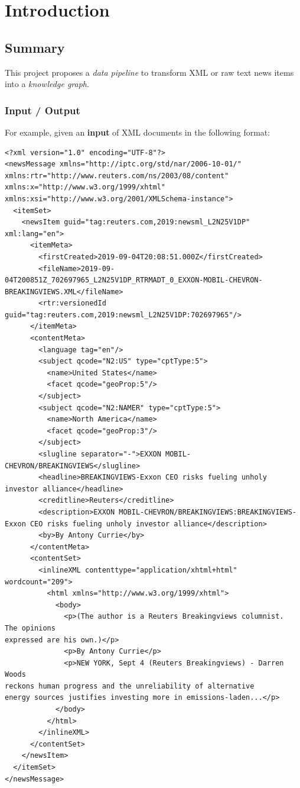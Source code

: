 \documentclass[11pt]{article}
\begin{document}
\newpage
\section{Introduction}
\subsection{Summary}
This project proposes a \textit{data pipeline} to transform XML or raw text news items into a \textit{knowledge graph}.

\subsubsection{Input / Output}
For example, given an \textbf{input} of XML documents in the following format:
\begin{lstlisting}[basicstyle=\tiny]
<?xml version="1.0" encoding="UTF-8"?>
<newsMessage xmlns="http://iptc.org/std/nar/2006-10-01/" xmlns:rtr="http://www.reuters.com/ns/2003/08/content" xmlns:x="http://www.w3.org/1999/xhtml" xmlns:xsi="http://www.w3.org/2001/XMLSchema-instance">
  <itemSet>
    <newsItem guid="tag:reuters.com,2019:newsml_L2N25V1DP" xml:lang="en">
      <itemMeta>
        <firstCreated>2019-09-04T20:08:51.000Z</firstCreated>
        <fileName>2019-09-04T200851Z_702697965_L2N25V1DP_RTRMADT_0_EXXON-MOBIL-CHEVRON-BREAKINGVIEWS.XML</fileName>
        <rtr:versionedId guid="tag:reuters.com,2019:newsml_L2N25V1DP:702697965"/>
      </itemMeta>
      <contentMeta>
        <language tag="en"/>
        <subject qcode="N2:US" type="cptType:5">
          <name>United States</name>
          <facet qcode="geoProp:5"/>
        </subject>
        <subject qcode="N2:NAMER" type="cptType:5">
          <name>North America</name>
          <facet qcode="geoProp:3"/>
        </subject>
        <slugline separator="-">EXXON MOBIL-CHEVRON/BREAKINGVIEWS</slugline>
        <headline>BREAKINGVIEWS-Exxon CEO risks fueling unholy investor alliance</headline>
        <creditline>Reuters</creditline>
        <description>EXXON MOBIL-CHEVRON/BREAKINGVIEWS:BREAKINGVIEWS-Exxon CEO risks fueling unholy investor alliance</description>
        <by>By Antony Currie</by>
      </contentMeta>
      <contentSet>
        <inlineXML contenttype="application/xhtml+html" wordcount="209">
          <html xmlns="http://www.w3.org/1999/xhtml">
            <body>
              <p>(The author is a Reuters Breakingviews columnist.  The opinions
expressed are his own.)</p>
              <p>By Antony Currie</p>
              <p>NEW YORK, Sept 4 (Reuters Breakingviews) - Darren Woods
reckons human progress and the unreliability of alternative
energy sources justifies investing more in emissions-laden...</p>
            </body>
          </html>
        </inlineXML>
      </contentSet>
    </newsItem>
  </itemSet>
</newsMessage>
\end{lstlisting}
\end{document}

